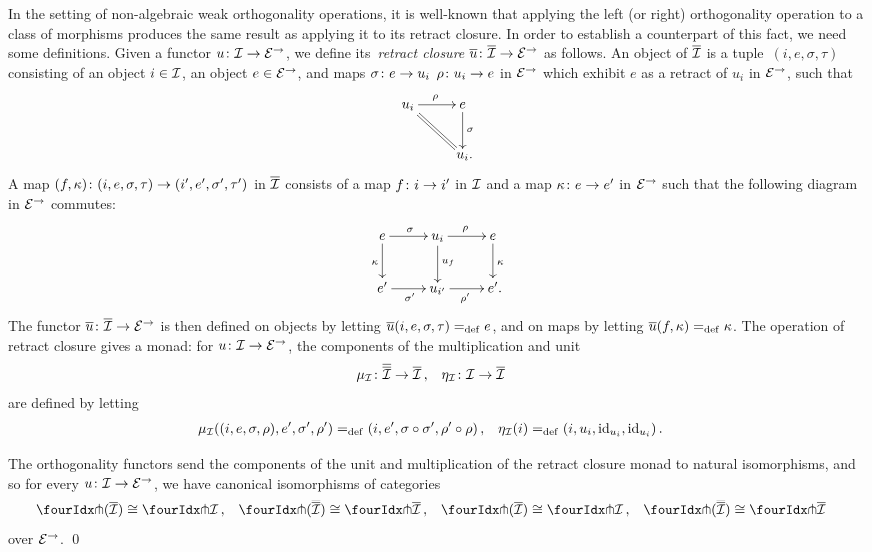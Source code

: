 \documentclass[reqno,10pt,a4paper,oneside,draft]{amsart}
\begin{document}
In the setting of non-algebraic weak orthogonality operations, it is well-known that applying the left (or right) orthogonality operation to a class of morphisms produces the same result as applying it to its retract closure.
In order to establish a counterpart of this fact, we need some definitions.
Given a functor $u \co \cal{I} \to \calE^\to$, we define its~\emph{retract closure} $\overline{u} \co \overline{\cal{I}} \to \catE^\to$ as follows.
An object of $\overline{\cal{I}}$ is a tuple~$(i, e, \sigma, \tau)$ consisting of an object $i \in \cal{I}$, an object $e \in \catE^\to$, and maps $\sigma \co e \rightarrow u_i$ $\rho \co u_i \rightarrow e$ in $\catE^\to$ which exhibit $e$ as a retract of $u_i$ in $\catE^\to$, \ie such that
\[
\xymatrix{
  u_i
  \ar[r]^\rho
  \ar@{=}[dr]
&
  e
  \ar[d]^{\sigma}
\\&
  u_i
\rlap{.}}
\]
A map $(f, \kappa) \co (i, e, \sigma, \tau) \to (i', e', \sigma', \tau')$ in $\overline{\cal{I}}$ consists of a map $f \co i \to i'$ in $\cal{I}$ and a map $\kappa \co e \rightarrow e'$ in $\catE^\to$ such that the following diagram in $\catE^\to$ commutes:
\[
\xymatrix{
  e
  \ar[r]^{\sigma}
  \ar[d]_{\kappa}
&
  u_i
  \ar[r]^{\rho}
  \ar[d]^{u_f}
&
  e
  \ar[d]^{\kappa}
\\
  e'
  \ar[r]_{\sigma'}
&
  u_{i'}
  \ar[r]_{\rho'}
&
  e'
\rlap{.}}
\]
The functor $\overline{u} \co \overline{\cal{I}} \to \catE^\to$ is then defined on objects by letting $\overline{u}(i, e, \sigma, \tau) \defeq e$, and on maps by letting $\overline{u}(f, \kappa) \defeq \kappa$.
The operation of retract closure gives a monad: for $u \co \cal{I} \to \catE^\to$, the components of the multiplication and unit
\[
\begin{aligned}
  \mu_\cal{I} &\co \overline{\overline{\cal{I}}} \to \overline{\cal{I}}
\, , &
  \eta_\cal{I} &\co \cal{I} \to \overline{\cal{I}}
\end{aligned}
\]
are defined by letting
\[
\begin{aligned}
  \mu_\cal{I}((i, e, \sigma, \rho), e', \sigma', \rho') &\defeq (i, e', \sigma \cc \sigma', \rho' \cc \rho)
\, , &
  \eta_\cal{I}(i) &\defeq (i, u_i, \id_{u_i}, \id_{u_i})
\, .
\end{aligned}
\]

\begin{proposition} \label{retract-closure}
The orthogonality functors send the components of the unit and multiplication of the retract closure monad to natural isomorphisms, and so for every $u \co \cal{I} \to \catE^\to$, we have canonical isomorphisms of categories
\[
\begin{aligned}
  \liftr{(\overline{\cal{I}})} &\iso \liftr{\cal{I}}
\, ,&
  \liftr{(\overline{\overline{\cal{I}}})} &\iso \liftr{\overline{\cal{I}}}
\, ,&
  \liftl{(\overline{\cal{I}})} &\iso \liftl{\cal{I}}
\, ,&
 \liftl{(\overline{\overline{\cal{I}}})} &\iso \liftl{\overline{\cal{I}}}
\end{aligned}
\]
over $\catE^\to$.
\qed
\end{proposition}
\end{document}
